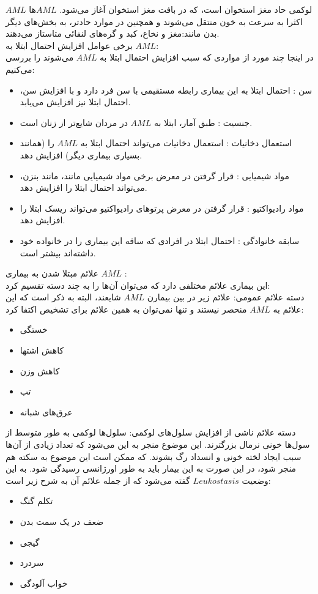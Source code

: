 \documentclass[a4paper,12pt]{article}
\begin{document}
$AML$
لوکمی حاد مغز استخوان است، که در بافت مغز استخوان آغاز می‌شود. $AML$ها اکثرا به سرعت به خون منتقل می‌شوند و همچنین در موارد حادتر، به بخش‌های دیگر بدن مانند:مغز و نخاع، کبد و گره‌های لنفائی متاستاز می‌دهند.\\
برخی عوامل افزایش احتمال ابتلا به $AML$:\\
در اینجا چند مورد از مواردی که سبب افزایش احتمال ابتلا به $AML$ می‌شوند را بررسی می‌کنیم:
\begin{itemize}
\item سن : احتمال ابتلا به این بیماری رابطه مستقیمی با سن فرد دارد و با افزایش سن، احتمال ابتلا نیز افزایش می‌یابد.
\item جنسیت : طبق آمار، ابتلا به $AML$ در مردان شایع‌تر از زنان است.
\item استعمال دخانیات : استعمال دخانیات می‌تواند احتمال ابتلا به $AML$ را (همانند بسیاری بیماری دیگر) افزایش دهد.
\item مواد شیمیایی : قرار گرفتن در معرض برخی مواد شیمیایی مانند، مانند بنزن، می‌تواند احتمال ابتلا را افزایش دهد.
\item مواد رادیواکتیو : قرار گرفتن در معرض پرتوهای رادیواکتیو می‌تواند ریسک ابتلا را افزایش دهد.
\item سابقه خانوادگی : احتمال ابتلا در افرادی که ساقه این بیماری را در خانواده خود داشته‌اند بیشتر است.
\end{itemize}
علائم مبتلا شدن به بیماری $AML$ : \\
این بیماری علائم مختلفی دارد که می‌توان آن‌ها را به چند دسته تقسیم کرد:\\
دسته علائم عمومی: علائم زیر در بین بیمارن $AML$ شایعند، البته به ذکر است که این علائم به $AML$ منحصر نیستند و تنها نمی‌توان به همین علائم برای تشخیص اکتفا کرد:
\begin{itemize}
\item خستگی
\item کاهش اشتها
\item کاهش وزن
\item تب
\item عرق‌های شبانه
\end{itemize}
دسته علائم ناشی از افزایش سلول‌های لوکمی: سلول‌ها لوکمی به طور متوسط از سول‌ها خونی نرمال بزرگترند. این موضوع منجر به این می‌شود که تعداد زیادی از آن‌ها سبب ایجاد لخته خونی و انسداد رگ بشوند. که ممکن است این موضوع به سکته هم منجر شود، در این صورت به این بیمار باید به طور اورژانسی رسیدگی شود. به این وضعیت $Leukostasis$ گفته می‌شود که از جمله علائم آن به شرح زیر است:
\begin{itemize}
\item تکلم گنگ
\item ضعف در یک سمت بدن
\item گیجی
\item سردرد
\item خواب آلودگی
\end{itemize}
\end{document}
